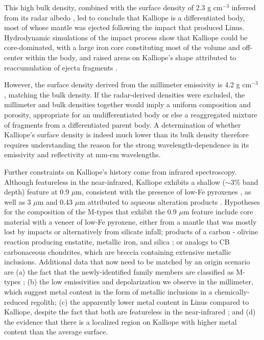 \documentclass[]{aastex631}
\begin{document}
This high bulk density, combined with the surface density of 2.3 g cm$^{-3}$ inferred from its radar albedo \citep{shepard2015}, led \cite{broz2022} to conclude that Kalliope is a differentiated body, most of whose mantle was ejected following the impact that produced Linus. Hydrodynamic simulations of the impact process show that Kalliope could be core-dominated, with a large iron core constituting most of the volume and off-center within the body, and raised areas on Kalliope's shape attributed to reaccumulation of ejecta fragments \citep{broz2022}.

However, the surface density derived from the millimeter emissivity is 4.2 g cm$^{-3}$ \citep[using the conversion from][for direct comparison with radar-derived densities]{ostro1985}, matching the bulk density. If the radar-derived densities were excluded, the millimeter and bulk densities together would imply a uniform composition and porosity, appropriate for an undifferentiated body or else a reaggregated mixture of fragments from a differentiated parent body. A determination of whether Kalliope's surface density is indeed much lower than its bulk density therefore requires understanding the reason for the strong wavelength-dependence in its emissivity and reflectivity at mm-cm wavelengths.

Further constraints on Kalliope's history come from infrared spectroscopy. Although featureless in the near-infrared, Kalliope exhibits a shallow ($\sim$3\% band depth) feature at 0.9 $\mu$m, consistent with the presence of low-Fe pyroxenes \citep{2004AJClark,2010IcarFornasier}, as well as 3 $\mu$m and 0.43 $\mu$m attributed to aqueous alteration products \citep{2010IcarFornasier,rivkin2000}. Hypotheses for the composition of the M-types that exhibit the 0.9 $\mu$m feature include core material with a veneer of low-Fe pyroxene, either from a mantle that was mostly lost by impacts or alternatively from silicate infall; products of a carbon - olivine reaction producing enstatite, metallic iron, and silica \citep{hardersen2005}; or analogs to CB carbonaceous chondrites, which are breccia containing extensive metallic inclusions. Additional data that now need to be matched by an origin scenario are (a) the fact that the newly-identified family members are classified as M-types \citep{broz2022}; (b) the low emissivities and depolarization we observe in the millimeter, which suggest metal content in the form of metallic inclusions in a chemically-reduced regolith; (c) the apparently lower metal content in Linus compared to Kalliope, despite the fact that both are featureless in the near-infrared \citep{laver2009}; and (d) the evidence that there is a localized region on Kalliope with higher metal content than the average surface.
\end{document}
